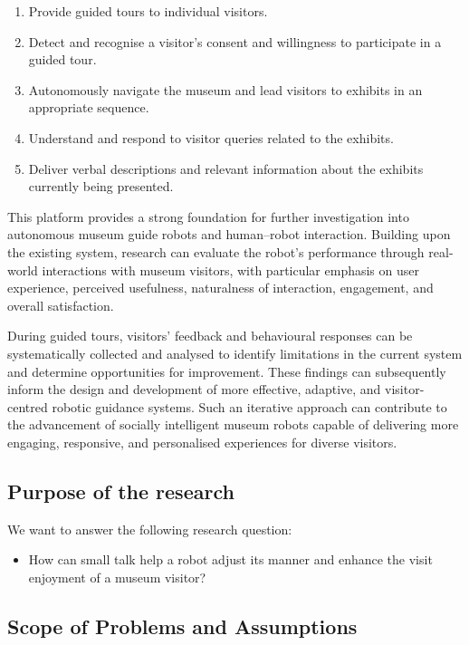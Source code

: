 \documentclass[conference]{IEEEtran}
\begin{document}
\begin{enumerate}
    \item Provide guided tours to individual visitors.
    \item Detect and recognise a visitor’s consent and willingness to participate in a guided tour.
    \item Autonomously navigate the museum and lead visitors to exhibits in an appropriate sequence.
    \item Understand and respond to visitor queries related to the exhibits.
    \item Deliver verbal descriptions and relevant information about the exhibits currently being presented.
\end{enumerate}
This platform provides a strong foundation for further investigation into autonomous museum guide robots and human–robot interaction. Building upon the existing system, research can evaluate the robot’s performance through real-world interactions with museum visitors, with particular emphasis on user experience, perceived usefulness, naturalness of interaction, engagement, and overall satisfaction.

During guided tours, visitors’ feedback and behavioural responses can be systematically collected and analysed to identify limitations in the current system and determine opportunities for improvement. These findings can subsequently inform the design and development of more effective, adaptive, and visitor-centred robotic guidance systems. Such an iterative approach can contribute to the advancement of socially intelligent museum robots capable of delivering more engaging, responsive, and personalised experiences for diverse visitors.


\subsection{Purpose of the research}

We want to answer the following research question:
\begin{itemize}
    \item How can small talk help a robot adjust its manner and enhance the visit enjoyment of a museum visitor?
\end{itemize}

\subsection{Scope of Problems and Assumptions}
\end{document}
